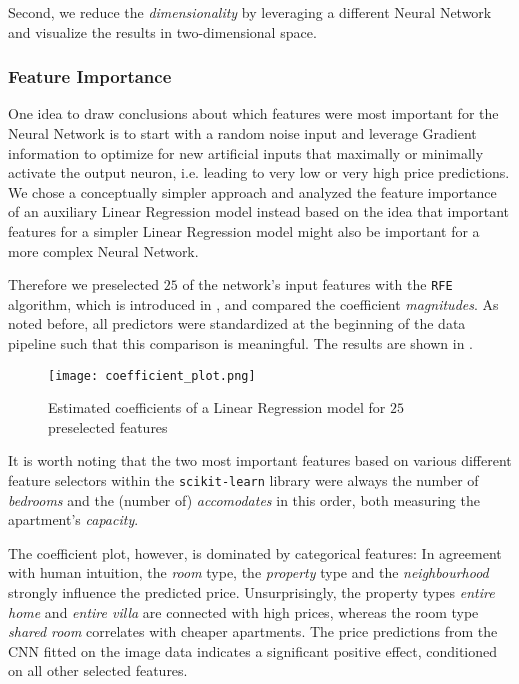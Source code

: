 Second, we reduce the \emph{dimensionality} by leveraging a different Neural Network and visualize the results in two-dimensional space.

\subsubsection{Feature Importance}

One idea to draw conclusions about which features were most important for the Neural Network is to start with a random noise input and leverage Gradient information to optimize for new artificial inputs that maximally or minimally activate the output neuron, i.e. leading to very low or very high price predictions.
We chose a conceptually simpler approach and analyzed the feature importance of an auxiliary Linear Regression model instead based on the idea that important features for a simpler Linear Regression model might also be important for a more complex Neural Network.

Therefore we preselected $25$ of the network's input features with the \texttt{RFE} algorithm, which is introduced in , and compared the coefficient \emph{magnitudes}.
As noted before, all predictors were standardized at the beginning of the data pipeline such that this comparison is meaningful.
The results are shown in .

\begin{figure}[t]
  \centering
  \texttt{[image: coefficient\_plot.png]}
  \caption{Estimated coefficients of a Linear Regression model for $25$ preselected features}
  \label{fig:coefficient-plot}
\end{figure}

It is worth noting that the two most important features based on various different feature selectors within the \texttt{scikit-learn} library were always the number of \emph{bedrooms} and the (number of) \emph{accomodates} in this order, both measuring the apartment's \emph{capacity}.

The coefficient plot, however, is dominated by categorical features:
In agreement with human intuition, the \emph{room} type, the \emph{property} type and the \emph{neighbourhood} strongly influence the predicted price.
Unsurprisingly, the property types \emph{entire home} and \emph{entire villa} are connected with high prices, whereas the room type \emph{shared room} correlates with cheaper apartments.
The price predictions from the CNN fitted on the image data indicates a significant positive effect, conditioned on all other selected features.

